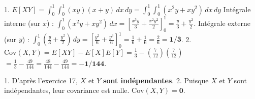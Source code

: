 \begin{correctionbox}
1.  $E[XY] = \int_0^1 \int_0^1 (xy)(x+y) \, dx \, dy = \int_0^1 \int_0^1 (x^2y + xy^2) \, dx \, dy$
    Intégrale interne (sur $x$) : $\int_0^1 (x^2y + xy^2) \, dx = \left[ \frac{x^3y}{3} + \frac{x^2y^2}{2} \right]_0^1 = \frac{y}{3} + \frac{y^2}{2}$.
    Intégrale externe (sur $y$) : $\int_0^1 (\frac{y}{3} + \frac{y^2}{2}) \, dy = \left[ \frac{y^2}{6} + \frac{y^3}{6} \right]_0^1 = \frac{1}{6} + \frac{1}{6} = \frac{2}{6} = \mathbf{1/3}$.
2.  $\text{Cov}(X, Y) = E[XY] - E[X]E[Y] = \frac{1}{3} - \left(\frac{7}{12}\right)\left(\frac{7}{12}\right)$
    $= \frac{1}{3} - \frac{49}{144} = \frac{48}{144} - \frac{49}{144} = \mathbf{-1/144}$.
\end{correctionbox}

\begin{correctionbox}
1.  D'après l'exercice 17, $X$ et $Y$ \textbf{sont indépendantes}.
2.  Puisque $X$ et $Y$ sont indépendantes, leur covariance est nulle.
    $\text{Cov}(X, Y) = \mathbf{0}$.
\end{correctionbox}